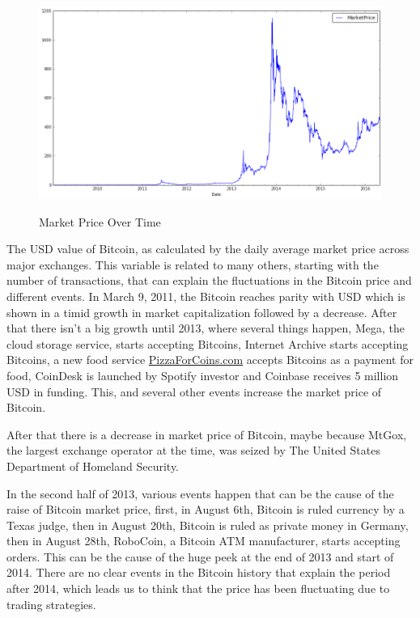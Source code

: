 \begin{figure}[bth]
  \myfloatalign
  {\includegraphics[width=1\linewidth]
    {gfx/market-price-over-time}}
  \caption{Market Price Over Time}
  \label{fig:market-price-over-time}
\end{figure}

The USD value of Bitcoin, as calculated by the daily average market
price across major exchanges. This variable is related to many others,
starting with the number of transactions, that can explain the
fluctuations in the Bitcoin price and different events. In March 9,
2011, the Bitcoin reaches parity with USD which is shown in a timid
growth in market capitalization followed by a decrease. After that
there isn't a big growth until 2013, where several things happen,
Mega, the cloud storage service, starts accepting Bitcoins, Internet
Archive starts accepting Bitcoins, a new food service
\href{PizzaForCoins.com}{PizzaForCoins.com} accepts Bitcoins as a
payment for food, CoinDesk is launched by Spotify investor and
Coinbase receives 5 million USD in funding. This, and several other
events increase the market price of Bitcoin.

After that there is a decrease in market price of Bitcoin, maybe
because MtGox, the largest exchange operator at the time, was seized
by The United States Department of Homeland Security.

In the second half of 2013, various events happen that can be the
cause of the raise of Bitcoin market price, first, in August 6th,
Bitcoin is ruled currency by a Texas judge, then in August 20th,
Bitcoin is ruled as private money in Germany, then in August 28th,
RoboCoin, a Bitcoin ATM manufacturer, starts accepting orders. This
can be the cause of the huge peek at the end of 2013 and start of
2014. There are no clear events in the Bitcoin history that explain
the period after 2014, which leads us to think that the price has been
fluctuating due to trading strategies.


